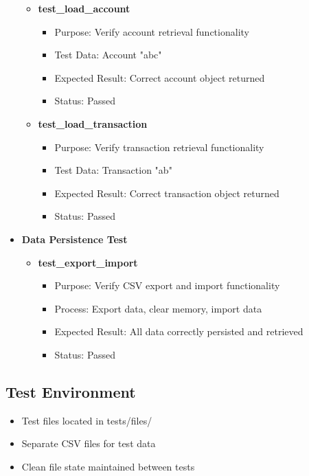 \documentclass[a4paper,11pt]{article}
\begin{document}
\begin{itemize}
\begin{itemize}
  \item \textbf{test\_load\_account}
    \begin{itemize}
    \item Purpose: Verify account retrieval functionality
    \item Test Data: Account "abc"
    \item Expected Result: Correct account object returned
    \item Status: Passed
    \end{itemize}

  \item \textbf{test\_load\_transaction}
    \begin{itemize}
    \item Purpose: Verify transaction retrieval functionality
    \item Test Data: Transaction "ab"
    \item Expected Result: Correct transaction object returned
    \item Status: Passed
    \end{itemize}
  \end{itemize}

\item \textbf{Data Persistence Test}
  \begin{itemize}
  \item \textbf{test\_export\_import}
    \begin{itemize}
    \item Purpose: Verify CSV export and import functionality
    \item Process: Export data, clear memory, import data
    \item Expected Result: All data correctly persisted and retrieved
    \item Status: Passed
    \end{itemize}
  \end{itemize}
\end{itemize}

\subsection{Test Environment}
\begin{itemize}
\item Test files located in tests/files/
\item Separate CSV files for test data
\item Clean file state maintained between tests
\end{itemize}
\end{document}
